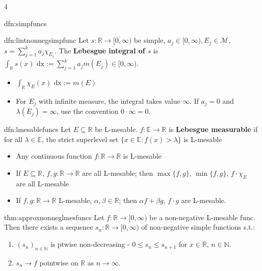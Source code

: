 \documentclass[landscape, 8pt]{extarticle}
\begin{document}
\begin{multicols*}{4}
\begin{dfn}{dfn:simpfuncs}{ }
		\end{dfn}
		
		
		\begin{dfn}{dfn:lintnonnegsimpfunc}{ }
			Let $s: \mathbb{R} \to [0, \infty)$ be simple, $a_j\in [0, \infty), E_j\in \mathcal{M}$, $s = \sum_{j=1}^{k}a_j \chi_{E_j}$. The \textbf{Lebesgue integral of $s$} is $\int_\mathbb{R} s(x) \text{ dx} := \sum_{j=1}^{k}a_j m(E_j)\in [0, \infty)$.
			\begin{itemize}
				\item $\int_\mathbb{R} \chi_E(x) \text{ dx} := m(E)$
				\vspace{1pt}
				\item For $E_j$ with infinite measure, the integral takes value $\infty$. If $a_j = 0$ and $\lambda(E_j) = \infty$, use the convention $0 \cdot \infty = 0$.
			\end{itemize}
			
		\end{dfn}
		
		
		\begin{mdfn}{dfn:lmesablefuncs}{ }
			Let $E \subseteq \mathbb{R}$ be L-mesable. $f: \mathbb{E} \to \mathbb{R}$ is \textbf{Lebesgue measurable} if for all $\lambda\in \mathbb{E}$, the strict superlevel set $\{x\in \mathbb{E} : f(x) > \lambda\}$ is L-mesable
			\begin{itemize}
				\item Any continuous function $f: \mathbb{R} \to \mathbb{R}$ is L-mesable
				\item If $E \subseteq \mathbb{R}$, $f, g : \mathbb{R} \to \mathbb{R}$ are all L-mesable; then $\max\{f, g\}$, $\min\{f, g\}$, $f\cdot\chi_E$ are all L-mesable
				\item If $f, g : \mathbb{R} \to \mathbb{R}$ L-mesable, $\alpha, \beta\in \mathbb{R}$; then $\alpha f + \beta g$, $f \cdot g$ are L-mesable.
			\end{itemize}
			
		\end{mdfn}
		
		
		\begin{thm}{thm:approxnonneglmesfuncs}{ }
			Let $f: \mathbb{R} \to [0, \infty)$ be a non-negative L-mesable func. Then there exists a sequence $s_n : \mathbb{R} \to [0, \infty)$ of non-negative simple functions s.t.:
			\begin{enumerate}[label=(\arabic*)]
				\item $(s_n)_{n\in \mathbb{N}}$ is ptwise non-decreasing - $0 \le s_n \le s_{n+1}$ for $x\in \mathbb{R}$, $n\in \mathbb{N}$.
				\item $s_n \to f$ pointwise on $\mathbb{R}$ as $n \to \infty$.
			\end{enumerate}
			

\end{thm}
\end{multicols*}
\end{document}
